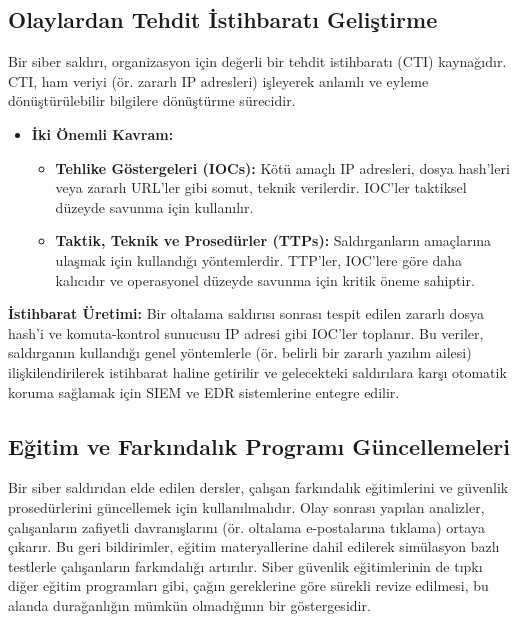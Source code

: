\subsection{Olaylardan Tehdit İstihbaratı Geliştirme}

Bir siber saldırı, organizasyon için değerli bir tehdit istihbaratı (CTI) kaynağıdır. CTI, ham veriyi (ör. zararlı IP adresleri) işleyerek anlamlı ve eyleme dönüştürülebilir bilgilere dönüştürme sürecidir.

\begin{itemize}
    \item \textbf{İki Önemli Kavram:}
    \begin{itemize}
        \item \textbf{Tehlike Göstergeleri (IOCs):} Kötü amaçlı IP adresleri, dosya hash'leri veya zararlı URL'ler gibi somut, teknik verilerdir. IOC'ler taktiksel düzeyde savunma için kullanılır.
        \item \textbf{Taktik, Teknik ve Prosedürler (TTPs):} Saldırganların amaçlarına ulaşmak için kullandığı yöntemlerdir. TTP'ler, IOC'lere göre daha kalıcıdır ve operasyonel düzeyde savunma için kritik öneme sahiptir.
    \end{itemize}
\end{itemize}
\textbf{İstihbarat Üretimi:}
Bir oltalama saldırısı sonrası tespit edilen zararlı dosya hash'i ve komuta-kontrol sunucusu IP adresi gibi IOC'ler toplanır. Bu veriler, saldırganın kullandığı genel yöntemlerle (ör. belirli bir zararlı yazılım ailesi) ilişkilendirilerek istihbarat haline getirilir ve gelecekteki saldırılara karşı otomatik koruma sağlamak için SIEM ve EDR sistemlerine entegre edilir.

\subsection{Eğitim ve Farkındalık Programı Güncellemeleri}

Bir siber saldırıdan elde edilen dersler, çalışan farkındalık eğitimlerini ve güvenlik prosedürlerini güncellemek için kullanılmalıdır. Olay sonrası yapılan analizler, çalışanların zafiyetli davranışlarını (ör. oltalama e-postalarına tıklama) ortaya çıkarır. Bu geri bildirimler, eğitim materyallerine dahil edilerek simülasyon bazlı testlerle çalışanların farkındalığı artırılır. Siber güvenlik eğitimlerinin de tıpkı diğer eğitim programları gibi, çağın gereklerine göre sürekli revize edilmesi, bu alanda durağanlığın mümkün olmadığının bir göstergesidir.

